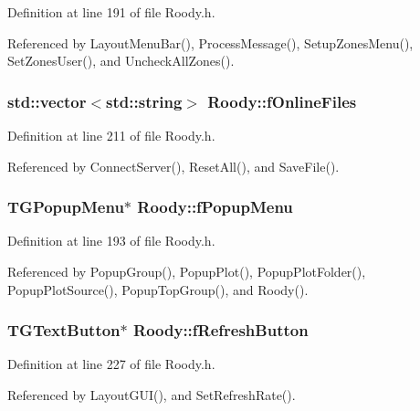 Definition at line 191 of file Roody.h.



Referenced by LayoutMenuBar(), ProcessMessage(), SetupZonesMenu(), SetZonesUser(), and UncheckAllZones().

\subsubsection[{fOnlineFiles}]{\setlength{\rightskip}{0pt plus 5cm}std::vector$<$std::string$>$ {\bf Roody::fOnlineFiles}\hspace{0.3cm}{\ttfamily  [private]}}\label{classRoody_a5109207cb67ff1657c267cf725fbf02b}


Definition at line 211 of file Roody.h.



Referenced by ConnectServer(), ResetAll(), and SaveFile().

\subsubsection[{fPopupMenu}]{\setlength{\rightskip}{0pt plus 5cm}TGPopupMenu$\ast$ {\bf Roody::fPopupMenu}\hspace{0.3cm}{\ttfamily  [private]}}\label{classRoody_a53aa4ef3d5ec121e9dd2b8b18f423860}


Definition at line 193 of file Roody.h.



Referenced by PopupGroup(), PopupPlot(), PopupPlotFolder(), PopupPlotSource(), PopupTopGroup(), and Roody().

\subsubsection[{fRefreshButton}]{\setlength{\rightskip}{0pt plus 5cm}TGTextButton$\ast$ {\bf Roody::fRefreshButton}\hspace{0.3cm}{\ttfamily  [private]}}\label{classRoody_a50ba72d5913e754d763db1450a61f8fb}


Definition at line 227 of file Roody.h.



Referenced by LayoutGUI(), and SetRefreshRate().

